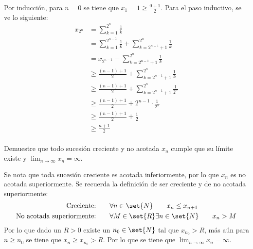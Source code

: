 \documentclass{ayudantia}
\begin{document}
\begin{ans}
    \begin{sol}
        Por inducción, para \(n=0\) se tiene que \(x_1=1\geq\frac{0+1}2\). Para el paso inductivo, se ve lo siguiente:
        \begin{align*}
            x_{2^n} & =\sum_{k=1}^{2^n}\frac1k                                     \\
                    & =\sum_{k=1}^{2^{n-1}}\frac1k+\sum_{k=2^{n-1}+1}^{2^n}\frac1k \\
                    & =x_{2^{n-1}}+\sum_{k=2^{n-1}+1}^{2^n}\frac1k                 \\
                    & \geq \frac{(n-1)+1}2+\sum_{k=2^{n-1}+1}^{2^n}\frac1k         \\
                    & \geq \frac{(n-1)+1}2+\sum_{k=2^{n-1}+1}^{2^n}\frac1{2^n}     \\
                    & \geq \frac{(n-1)+1}2+2^{n-1}\cdot\frac1{2^n}                 \\
                    & \geq \frac{(n-1)+1}2+\frac12                                 \\
                    & \geq \frac{n+1}2                                             \\
        \end{align*}
    \end{sol}
\end{ans}


\begin{prob}
    Demuestre que todo sucesión creciente y no acotada \(x_n\) cumple que su límite existe y \(\lim_{n\rightarrow\infty}x_n=\infty\).
\end{prob}

\begin{ans}
    \begin{sol}
        Se nota que toda sucesión creciente es acotada inferiormente, por lo que \(x_n\) es no acotada superiormente. Se recuerda la definición de ser creciente y de no acotada superiormente:
        \begin{align*}
            \text{Creciente:}                & \qquad\forall n\in\set{N} \qquad x_n\leq x_{n+1}          \\
            \text{No acotada superiormente:} & \qquad\forall M\in\set{R}\exists n\in\set{N} \qquad x_n>M
        \end{align*}
        Por lo que dado un \(R>0\) existe un \(n_0\in\set{N}\) tal que \(x_{n_0}>R\), más aún para \(n\geq n_0\) se tiene que \(x_n\geq x_{n_0}>R\). Por lo que se tiene que \(\lim_{n\rightarrow\infty}x_n=\infty\).
    \end{sol}
\end{ans}
\end{document}
